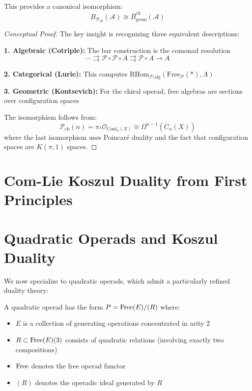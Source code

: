 \begin{example}
\begin{theorem}
This provides a canonical isomorphism:
$$B_{\mathcal{P}_{\text{ch}}}(\mathcal{A}) \cong \bar{B}^{\text{ch}}_{\text{geom}}(\mathcal{A})$$
\end{theorem}

\begin{proof}[Conceptual Proof]
The key insight is recognizing three equivalent descriptions:

\textbf{1. Algebraic (Cotriple):} The bar construction is the comonad resolution
$$\cdots \rightrightarrows \mathcal{P} \circ \mathcal{P} \circ A \rightrightarrows \mathcal{P} \circ A \to A$$

\textbf{2. Categorical (Lurie):} This computes $\text{RHom}_{\mathcal{P}\text{-alg}}(\text{Free}_{\mathcal{P}}(\ast), A)$

\textbf{3. Geometric (Kontsevich):} For the chiral operad, free algebras are sections over configuration spaces

The isomorphism follows from:
$$\mathcal{P}_{\text{ch}}(n) = \pi_*\mathcal{O}_{\text{Conf}_n(X)} \cong \Omega^{n-1}(\overline{C}_n(X))$$
where the last isomorphism uses Poincaré duality and the fact that configuration spaces are $K(\pi,1)$ spaces.
\end{proof}

\section{Com-Lie Koszul Duality from First Principles}
 
\section{Quadratic Operads and Koszul Duality}
 
We now specialize to quadratic operads, which admit a particularly refined duality theory:
 
\begin{definition}
A quadratic operad has the form $P = \operatorname{Free}(E)/(R)$ where:
\begin{itemize}
\item $E$ is a collection of generating operations concentrated in arity 2
\item $R \subset \operatorname{Free}(E)(3)$ consists of quadratic relations (involving exactly two compositions)
\item $\operatorname{Free}$ denotes the free operad functor
\item $(R)$ denotes the operadic ideal generated by $R$
\end{itemize}
\end{definition}
 

\end{example}
